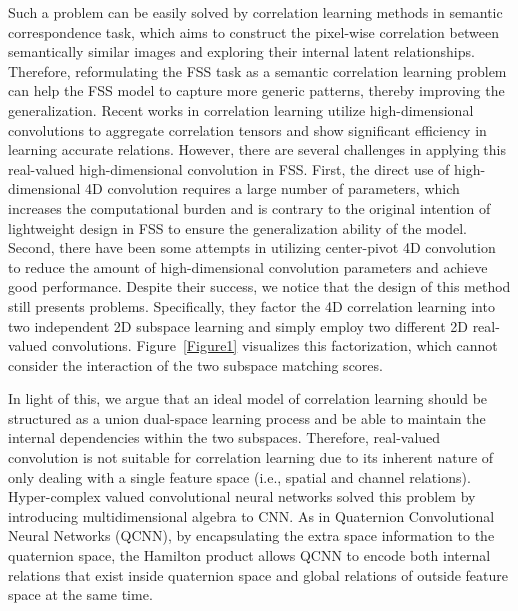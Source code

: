 \documentclass[lettersize,journal]{IEEEtran}
\begin{document}
Such a problem can be easily solved by correlation learning methods in semantic correspondence task, which aims to construct the pixel-wise correlation between semantically similar images and exploring their internal latent relationships. Therefore, reformulating the FSS task as a semantic correlation learning problem can help the FSS model to capture more generic patterns, thereby improving the generalization. Recent works in correlation learning\cite{RN19, RN38} utilize  high-dimensional convolutions to aggregate correlation tensors and show significant efficiency in learning accurate relations. However, there are several challenges in  applying this real-valued high-dimensional convolution in FSS. First, the direct use of high-dimensional 4D convolution\cite{RN19,RN42} requires a large number of parameters, which increases the computational burden and is contrary to the original intention of lightweight design in FSS to ensure the generalization ability of the model. Second, there have been some attempts in utilizing center-pivot 4D convolution \cite{RN38, RN85} to reduce the amount of high-dimensional convolution parameters and achieve good performance. Despite their success, we notice that the design of this method still presents problems. Specifically, they factor the 4D correlation learning into two independent 2D subspace learning and simply employ two different 2D real-valued convolutions. Figure~\ref{Figure1} visualizes this factorization, which cannot consider the interaction of the two subspace matching scores. 

In light of this, we argue that an ideal model of correlation learning should be structured as a union dual-space learning process and be able to maintain the internal dependencies within the two subspaces. Therefore, real-valued convolution is not suitable for correlation learning due to its inherent nature of only dealing with a single feature space (i.e., spatial and channel relations). Hyper-complex valued convolutional neural networks solved this problem by introducing multidimensional algebra to CNN. As in Quaternion Convolutional Neural Networks (QCNN), by encapsulating the extra space information to the quaternion space, the Hamilton product allows QCNN to encode both internal relations that exist inside quaternion space and global relations of outside feature space at the same time.
\end{document}

